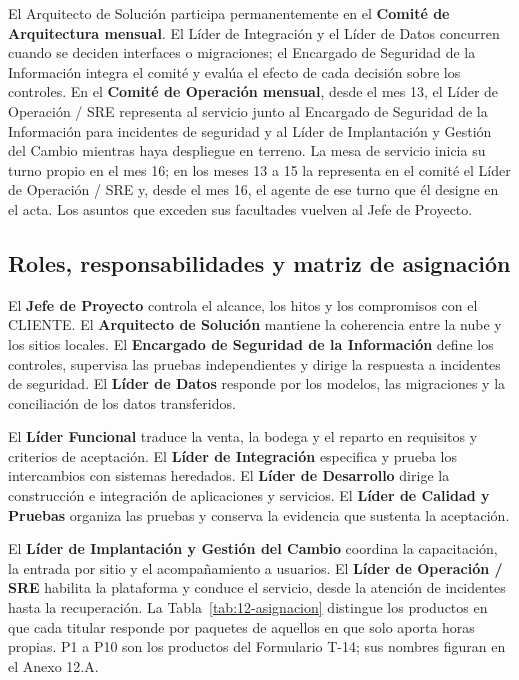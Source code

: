 El Arquitecto de Solución participa permanentemente en el \textbf{Comité de Arquitectura mensual}. El Líder de Integración y el Líder de Datos concurren cuando se deciden interfaces o migraciones; el Encargado de Seguridad de la Información integra el comité y evalúa el efecto de cada decisión sobre los controles. En el \textbf{Comité de Operación mensual}, desde el mes 13, el Líder de Operación / SRE representa al servicio junto al Encargado de Seguridad de la Información para incidentes de seguridad y al Líder de Implantación y Gestión del Cambio mientras haya despliegue en terreno. La mesa de servicio inicia su turno propio en el mes 16; en los meses 13 a 15 la representa en el comité el Líder de Operación / SRE y, desde el mes 16, el agente de ese turno que él designe en el acta. Los asuntos que exceden sus facultades vuelven al Jefe de Proyecto.

\subsection{Roles, responsabilidades y matriz de asignación}

El \textbf{Jefe de Proyecto} controla el alcance, los hitos y los compromisos con el CLIENTE. El \textbf{Arquitecto de Solución} mantiene la coherencia entre la nube y los sitios locales. El \textbf{Encargado de Seguridad de la Información} define los controles, supervisa las pruebas independientes y dirige la respuesta a incidentes de seguridad. El \textbf{Líder de Datos} responde por los modelos, las migraciones y la conciliación de los datos transferidos.

El \textbf{Líder Funcional} traduce la venta, la bodega y el reparto en requisitos y criterios de aceptación. El \textbf{Líder de Integración} especifica y prueba los intercambios con sistemas heredados. El \textbf{Líder de Desarrollo} dirige la construcción e integración de aplicaciones y servicios. El \textbf{Líder de Calidad y Pruebas} organiza las pruebas y conserva la evidencia que sustenta la aceptación.

El \textbf{Líder de Implantación y Gestión del Cambio} coordina la capacitación, la entrada por sitio y el acompañamiento a usuarios. El \textbf{Líder de Operación / SRE} habilita la plataforma y conduce el servicio, desde la atención de incidentes hasta la recuperación. La Tabla~\ref{tab:12-asignacion} distingue los productos en que cada titular responde por paquetes de aquellos en que solo aporta horas propias. P1 a P10 son los productos del Formulario T-14; sus nombres figuran en el Anexo 12.A.

